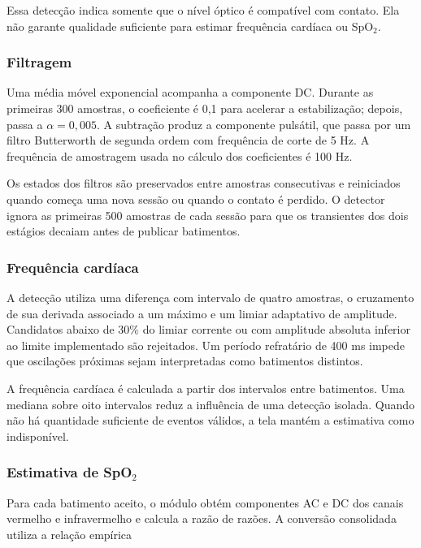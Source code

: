 \documentclass[a4paper,12pt]{article}
\begin{document}
Essa detec\c{c}\~ao indica somente que o n\'ivel \'optico \'e compat\'ivel com contato. Ela n\~ao garante qualidade suficiente para estimar frequ\^encia card\'iaca ou SpO$_2$.


\subsubsection{Filtragem}


Uma m\'edia m\'ovel exponencial acompanha a componente DC. Durante as primeiras 300 amostras, o coeficiente \'e 0,1 para acelerar a estabiliza\c{c}\~ao; depois, passa a $\alpha=0{,}005$. A subtra\c{c}\~ao produz a componente puls\'atil, que passa por um filtro Butterworth de segunda ordem com frequ\^encia de corte de 5 Hz. A frequ\^encia de amostragem usada no c\'alculo dos coeficientes \'e 100 Hz.


Os estados dos filtros s\~ao preservados entre amostras consecutivas e reiniciados quando come\c{c}a uma nova sess\~ao ou quando o contato \'e perdido. O detector ignora as primeiras 500 amostras de cada sess\~ao para que os transientes dos dois est\'agios decaiam antes de publicar batimentos.


\subsubsection{Frequ\^encia card\'iaca}


A detec\c{c}\~ao utiliza uma diferen\c{c}a com intervalo de quatro amostras, o cruzamento de sua derivada associado a um m\'aximo e um limiar adaptativo de amplitude. Candidatos abaixo de 30\% do limiar corrente ou com amplitude absoluta inferior ao limite implementado s\~ao rejeitados. Um per\'iodo refrat\'ario de 400 ms impede que oscila\c{c}\~oes pr\'oximas sejam interpretadas como batimentos distintos.


A frequ\^encia card\'iaca \'e calculada a partir dos intervalos entre batimentos. Uma mediana sobre oito intervalos reduz a influ\^encia de uma detec\c{c}\~ao isolada. Quando n\~ao h\'a quantidade suficiente de eventos v\'alidos, a tela mant\'em a estimativa como indispon\'ivel.


\subsubsection{Estimativa de SpO$_2$}


Para cada batimento aceito, o m\'odulo obt\'em componentes AC e DC dos canais vermelho e infravermelho e calcula a raz\~ao de raz\~oes. A convers\~ao consolidada utiliza a rela\c{c}\~ao emp\'irica
\end{document}
